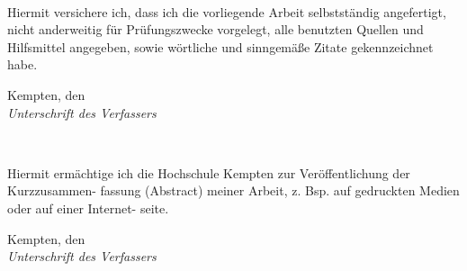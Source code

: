 \newpage
\thispagestyle{empty}


\\ 

\vspace*{2cm}

\noindent
Hiermit versichere ich, dass ich die vorliegende Arbeit selbstständig angefertigt, 
nicht anderweitig für Prüfungszwecke vorgelegt, alle benutzten
Quellen und Hilfsmittel angegeben, sowie wörtliche und sinngemäße Zitate gekennzeichnet habe.
\vspace{2cm}

\noindent
Kempten, den 
\hspace*{2cm}%
\dotfill\\
\hspace*{8.5cm}%
\textit{Unterschrift des Verfassers}

\vspace*{5cm}

\\ 

\vspace*{2cm}

\noindent
Hiermit ermächtige ich die Hochschule Kempten zur Veröffentlichung der Kurzzusammen-
fassung (Abstract) meiner Arbeit, z. Bsp. auf gedruckten Medien oder auf einer Internet-
seite.
\vspace{2cm}

\noindent
Kempten, den 
\hspace*{2cm}%
\dotfill\\
\hspace*{8.5cm}%
\textit{Unterschrift des Verfassers}
